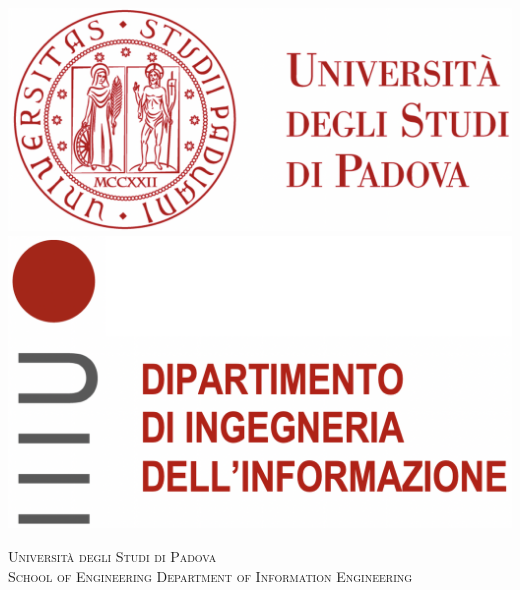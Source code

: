 \renewcommand{\cftpartleader}{\cftdotfill{\cftdotsep}} %
\renewcommand{\cftchapleader}{\cftdotfill{\cftdotsep}} %
\renewcommand{\cftsecleader}{\cftdotfill{\cftdotsep}} %





\begin{titlepage}
\begin{center}

\includegraphics[height=0.13\textheight]{logo_unipd.png}
\hfill
\includegraphics[height=0.13\textheight]{logo_dei.png}
\newline
\newline

\vspace{0.8cm}
\textsc{\LARGE Universit\`{a} degli Studi di Padova}\\
\vspace{1.6cm}
\textsc{\large School of Engineering Department of Information Engineering}\\
\vspace{0.4cm}


\end{center}
\end{titlepage}
